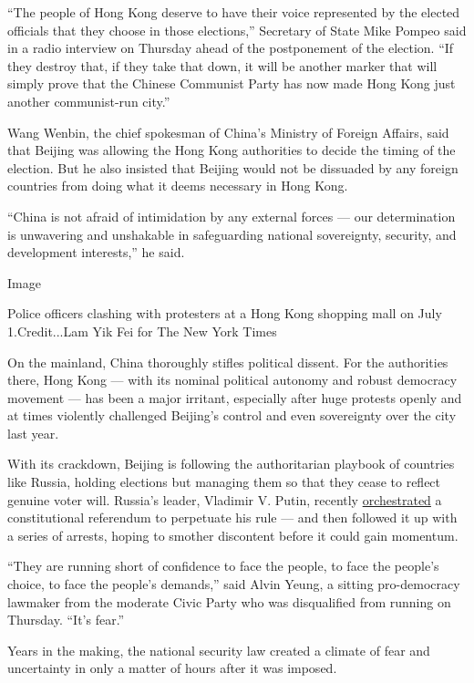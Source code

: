 ``The people of Hong Kong deserve to have their voice represented by the
elected officials that they choose in those elections,'' Secretary of
State Mike Pompeo said in a radio interview on Thursday ahead of the
postponement of the election. ``If they destroy that, if they take that
down, it will be another marker that will simply prove that the Chinese
Communist Party has now made Hong Kong just another communist-run
city.''

Wang Wenbin, the chief spokesman of China's Ministry of Foreign Affairs,
said that Beijing was allowing the Hong Kong authorities to decide the
timing of the election. But he also insisted that Beijing would not be
dissuaded by any foreign countries from doing what it deems necessary in
Hong Kong.

``China is not afraid of intimidation by any external forces --- our
determination is unwavering and unshakable in safeguarding national
sovereignty, security, and development interests,'' he said.

Image

Police officers clashing with protesters at a Hong Kong shopping mall on
July 1.Credit...Lam Yik Fei for The New York Times

On the mainland, China thoroughly stifles political dissent. For the
authorities there, Hong Kong --- with its nominal political autonomy and
robust democracy movement --- has been a major irritant, especially
after huge protests openly and at times violently challenged Beijing's
control and even sovereignty over the city last year.

With its crackdown, Beijing is following the authoritarian playbook of
countries like Russia, holding elections but managing them so that they
cease to reflect genuine voter will. Russia's leader, Vladimir V. Putin,
recently
\href{https://www.nytimes.com/2020/07/01/world/europe/putin-referendum-vote-russia.html}{orchestrated}
a constitutional referendum to perpetuate his rule --- and then followed
it up with a series of arrests, hoping to smother discontent before it
could gain momentum.

``They are running short of confidence to face the people, to face the
people's choice, to face the people's demands,'' said Alvin Yeung, a
sitting pro-democracy lawmaker from the moderate Civic Party who was
disqualified from running on Thursday. ``It's fear.''

Years in the making, the national security law created a climate of fear
and uncertainty in only a matter of hours after it was imposed.

